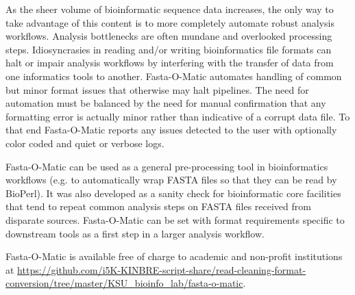 As the sheer volume of bioinformatic sequence data increases, the only way to take advantage of this content is to more completely automate robust analysis workflows. Analysis bottlenecks are often mundane and overlooked processing steps. Idiosyncrasies in reading and/or writing bioinformatics file formats can halt or impair analysis workflows by interfering with the transfer of data from one informatics tools to another. Fasta-O-Matic automates handling of common but minor format issues that otherwise may halt pipelines. The need for automation must be balanced by the need for manual confirmation that any formatting error is actually minor rather than indicative of a corrupt data file. To that end Fasta-O-Matic reports any issues detected to the user with optionally color coded and quiet or verbose logs.

Fasta-O-Matic can be used as a general pre-processing tool in bioinformatics workflows (e.g. to automatically wrap FASTA files so that they can be read by BioPerl). It was also developed as a sanity check for bioinformatic core facilities that tend to repeat common analysis steps on FASTA files received from disparate sources. Fasta-O-Matic can be set with format requirements specific to downstream tools as a first step in a larger analysis workflow.

Fasta-O-Matic is available free of charge to academic and non-profit institutions at \url{https://github.com/i5K-KINBRE-script-share/read-cleaning-format-conversion/tree/master/KSU\_bioinfo\_lab/fasta-o-matic}.
  
  
  
  
  
  
  
  
  
  